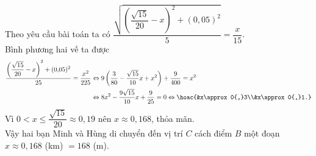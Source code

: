 \begin{bt}
{		Theo yêu cầu bài toán ta có $\dfrac{\sqrt{\left(\dfrac{\sqrt{15}}{20}-x\right)^2+(0{,}05)^2}}{5}=\dfrac{x}{15}$.\\ 
		Bình phương hai vế  ta được
		\begin{align*}
			\dfrac{\left(\dfrac{\sqrt{15}}{20}-x\right)^2+(0{,}05)^2}{25}=\dfrac{x^2}{225} 
			&\Leftrightarrow  9\left(\dfrac{3}{80}-\dfrac{\sqrt{15}}{10}x+x^2\right)+\dfrac{9}{400}=x^2\\
			&\Leftrightarrow 8x^2-\dfrac{9\sqrt{15}}{10}x+\dfrac{9}{25}=0\Leftrightarrow \hoac{&x\approx  0{,}3\\&x\approx0{,}1.}
		\end{align*}
		Vì $0<x\le\dfrac{\sqrt{15}}{20}\approx  0{,}19$ nên $x\approx 0{,}168$, thỏa mãn.\\
		Vậy hai bạn Minh và Hùng di chuyển đến vị trí $C$ cách điểm $B$  một đoạn $x\approx 0{,}168$ (km) $=168$ (m).
	} 
\end{bt}

